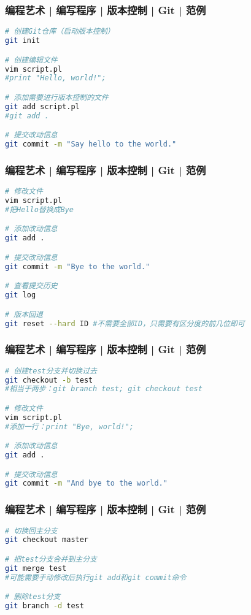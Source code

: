\begin{frame}[fragile]
  \frametitle{编程艺术 | 编写程序 | 版本控制 | Git | \alert{范例}}
  \vspace{-1.5em}
\begin{lstlisting}[language=sh]
# 创建Git仓库（启动版本控制）
git init

# 创建编辑文件
vim script.pl
#print "Hello, world!";

# 添加需要进行版本控制的文件
git add script.pl
#git add .

# 提交改动信息
git commit -m "Say hello to the world."
\end{lstlisting}
\end{frame}

\begin{frame}[fragile]
  \frametitle{编程艺术 | 编写程序 | 版本控制 | Git | 范例}
  \vspace{-1.5em}
\begin{lstlisting}[language=sh]
# 修改文件
vim script.pl
#把Hello替换成Bye

# 添加改动信息
git add .

# 提交改动信息
git commit -m "Bye to the world."

# 查看提交历史
git log

# 版本回退
git reset --hard ID #不需要全部ID，只需要有区分度的前几位即可
\end{lstlisting}
\end{frame}

\begin{frame}[fragile]
  \frametitle{编程艺术 | 编写程序 | 版本控制 | Git | \alert{范例}}
  \vspace{-1.5em}
\begin{lstlisting}[language=sh]
# 创建test分支并切换过去
git checkout -b test
#相当于两步：git branch test; git checkout test

# 修改文件
vim script.pl
#添加一行：print "Bye, world!";

# 添加改动信息
git add .

# 提交改动信息
git commit -m "And bye to the world."
\end{lstlisting}
\end{frame}

\begin{frame}[fragile]
  \frametitle{编程艺术 | 编写程序 | 版本控制 | Git | \alert{范例}}
\begin{lstlisting}[language=sh]
# 切换回主分支
git checkout master

# 把test分支合并到主分支
git merge test
#可能需要手动修改后执行git add和git commit命令

# 删除test分支
git branch -d test
\end{lstlisting}
\end{frame}

